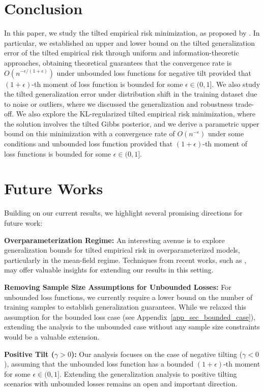 \documentclass{article}
\theoremstyle{plain}
\theoremstyle{plain}
\theoremstyle{definition}
\theoremstyle{remark}
\begin{document}
 \section{Conclusion } \label{sec:con}

In this paper, we study the tilted empirical risk minimization, as proposed by \citet{li2020tilted}. In particular, we established an upper and lower bound on the tilted generalization error of the tilted empirical risk through uniform and information-theoretic approaches, obtaining theoretical guarantees that the convergence rate is  $O(n^{-\epsilon/(1+\epsilon)})$ under unbounded loss functions for negative tilt provided that $(1+\epsilon)$-th moment of loss function is bounded for some $\epsilon\in(0,1]$.  We also study the tilted generalization error under distribution shift in the training dataset due to noise or outliers, where we discussed the generalization and robustness trade-off. 
We also explore the KL-regularized tilted empirical risk minimization, where the solution involves the tilted Gibbs posterior, and we derive a parametric upper bound on this minimization with a convergence rate of $O(n^{-\epsilon})$ under some conditions and unbounded loss function provided that $(1+\epsilon)$-th moment of loss functions is bounded for some $\epsilon\in(0,1]$.

\section{Future Works}\label{sec:future}
Building on our current results, we highlight several promising directions for future work:

\textbf{Overparameterization Regime:} An interesting avenue is to explore generalization bounds for tilted empirical risk in overparameterized models, particularly in the mean-field regime. Techniques from recent works, such as \citet{aminian2023mean}, may offer valuable insights for extending our results in this setting.

\textbf{Removing Sample Size Assumptions for Unbounded Losses:} For unbounded loss functions, we currently require a lower bound on the number of training samples to establish generalization guarantees. While we relaxed this assumption for the bounded loss case (see Appendix~\ref{app_sec_bounded_case}), extending the analysis to the unbounded case without any sample size constraints would be a valuable extension.

\textbf{Positive Tilt ($\gamma > 0$):} Our analysis focuses on the case of negative tilting ($\gamma < 0$), assuming that the unbounded loss function has a bounded $(1+\epsilon)$-th moment for some $\epsilon \in (0,1]$. Extending the generalization analysis to positive tilting scenarios with unbounded losses remains an open and important direction.
\end{document}
